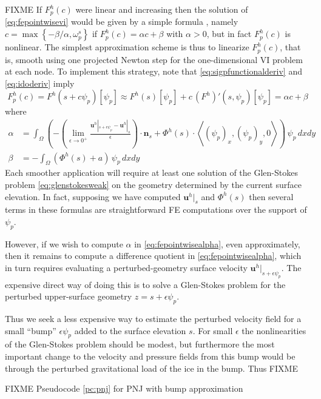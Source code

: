 \documentclass[letterpaper,final,12pt,reqno]{amsart}
\theoremstyle{claim}
\newcommand{\eps}{\epsilon}
\newcommand{\bn}{\mathbf{n}}
\newcommand{\bu}{\mathbf{u}}
\numberwithin{equation}{section}
\numberwithin{figure}{section}
\numberwithin{table}{section}
\numberwithin{theorem}{section}
\begin{document}
FIXME If $F_p^h(c)$ were linear and increasing then the solution of \eqref{eq:fepointwisevi} would be given by a simple formula \cite{GraeserKornhuber2009}, namely $c = \max\left\{-\beta/\alpha, \omega_p^s\right\}$ if $F_p^h(c) = \alpha c + \beta$ with $\alpha > 0$, but in fact $F_p^h(c)$ is nonlinear.  The simplest approximation scheme is thus to linearize $F_p^h(c)$, that is, smooth using one projected Newton step for the one-dimensional VI problem at each node.  To implement this strategy, note that \eqref{eq:sigpfunctionalderiv} and \eqref{eq:idoderiv} imply
\begin{equation}
F_p^h(c) = F^h(s+c\psi_p)[\psi_p] \approx F^h(s)[\psi_p] + c\, (F^h)'(s,\psi_p)[\psi_p] = \alpha c + \beta \label{eq:fepointwisefunctionalapprox}
\end{equation}
where
\begin{align}
\alpha &= \int_\Omega \left(- \left(\lim_{\eps\to 0^+} \frac{\bu^h|_{s+\eps \psi_p} - \bu^h|_s}{\eps}\right) \cdot \bn_s + \Phi^h(s) \cdot \left<(\psi_p)_x,(\psi_p)_y,0\right>\right)\, \psi_p \,dx dy \label{eq:fepointwisealpha} \\
\beta &= - \int_\Omega (\Phi^h(s) + a)\, \psi_p \,dx dy \label{eq:fepointwisebeta}
\end{align}
Each smoother application will require at least one solution of the Glen-Stokes problem \eqref{eq:glenstokesweak} on the geometry determined by the current surface elevation.  In fact, supposing we have computed $\bu^h|_s$ and $\Phi^h(s)$ then several terms in these formulas are straightforward FE computations over the support of $\psi_p$.

However, if we wish to compute $\alpha$ in \eqref{eq:fepointwisealpha}, even approximately, then it remains to compute a difference quotient in \eqref{eq:fepointwisealpha}, which in turn requires evaluating a perturbed-geometry surface velocity $\bu^h|_{s+\eps \psi_p}$.  The expensive direct way of doing this is to solve a Glen-Stokes problem for the perturbed upper-surface geometry $z=s + \eps \psi_p$.

Thus we seek a less expensive way to estimate the perturbed velocity field for a small ``bump'' $\eps\psi_p$ added to the surface elevation $s$.  For small $\eps$ the nonlinearities of the Glen-Stokes problem should be modest, but furthermore the most important change to the velocity and pressure fields from this bump would be through the perturbed gravitational load of the ice in the bump.  Thus FIXME

FIXME Pseudocode \ref{pc:pnj} for PNJ with bump approximation
\end{document}
